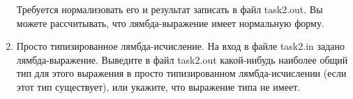 \documentclass[12pt,a4paper,oneside]{article}
\begin{document}
\begin{enumerate}
Требуется нормализовать его и результат записать в файл task2.out. 
Вы можете рассчитывать, что лямбда-выражение имеет нормальную форму.

%

%

\item Просто типизированное лямбда-исчисление. На вход в файле task2.in задано лямбда-выражение.
Выведите в файл task2.out какой-нибудь наиболее общий тип для этого выражения в просто типизированном 
лямбда-исчислении (если этот тип существует), или укажите, что выражение типа не имеет.


\end{enumerate}
\end{document}
